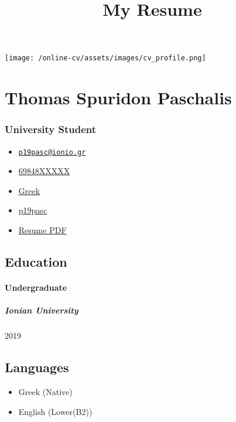 \documentclass[english,]{article}
\title{My Resume}
\date{}
\providecommand{\tightlist}{%
  \setlength{\itemsep}{0pt}\setlength{\parskip}{0pt}}
\let\oldparagraph\paragraph
\renewcommand{\paragraph}[1]{\oldparagraph{#1}\mbox{}}
\let\oldsubparagraph\subparagraph
\renewcommand{\subparagraph}[1]{\oldsubparagraph{#1}\mbox{}}
\begin{document}
\maketitle

\texttt{[image: /online-cv/assets/images/cv\_profile.png]}

\hypertarget{thomas-spuridon-paschalis}{%
\section{Thomas Spuridon Paschalis}\label{thomas-spuridon-paschalis}}

\hypertarget{university-student}{%
\subsubsection{University Student}\label{university-student}}

\begin{itemize}
\tightlist
\item
  \emph{} \href{mailto:p19pasc@ionio.gr}{\nolinkurl{p19pasc@ionio.gr}}
\item
  \emph{} \href{tel:69848XXXXX}{69848XXXXX}
\item
  \emph{} \href{}{Greek}
\item
  \emph{} \href{http://github.com/p19pasc}{p19pasc}
\item
  \emph{} \href{https://pdfhost.io/v/GXHEi9lTm_My_Resume}{Resume PDF}
\end{itemize}

\hypertarget{education}{%
\subsection{Education}\label{education}}

\hypertarget{undergraduate}{%
\paragraph{Undergraduate}\label{undergraduate}}

\hypertarget{ionian-university}{%
\subparagraph{Ionian University}\label{ionian-university}}

2019

\hypertarget{languages}{%
\subsection{Languages}\label{languages}}

\begin{itemize}
\tightlist
\item
  Greek {(Native)}
\item
  English {(Lower(B2))}
\end{itemize}
\end{document}
